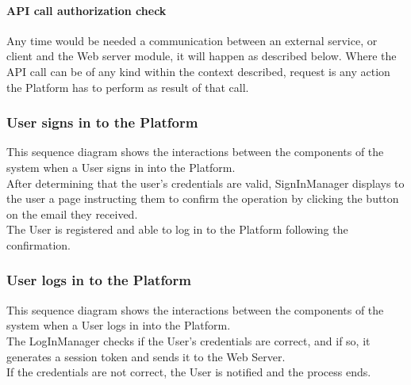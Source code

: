 \paragraph*{API call authorization check} \label{reff:authcheck}
Any time would be needed a communication between an external service, or client and the Web server module, it will happen as described below.
Where the API call can be of any kind within the context described, request is any action the Platform has to perform as result of that call.


\begin{landscape}

\clearpage
\subsubsection{User signs in to the Platform}
This sequence diagram shows the interactions between the components of the system when a User signs in into the Platform.\\
After determining that the user's credentials are valid, SignInManager displays to the user a page instructing them to confirm the operation by clicking the button on the email they received.\\
The User is registered and able to log in to the Platform following the confirmation.

\clearpage
\subsubsection{User logs in to the Platform}
This sequence diagram shows the interactions between the components of the system when a User logs in into the Platform.\\
The LogInManager checks if the User's credentials are correct, and if so, it generates a session token and sends it to the Web Server.\\
If the credentials are not correct, the User is notified and the process ends.

\clearpage

\end{landscape}

